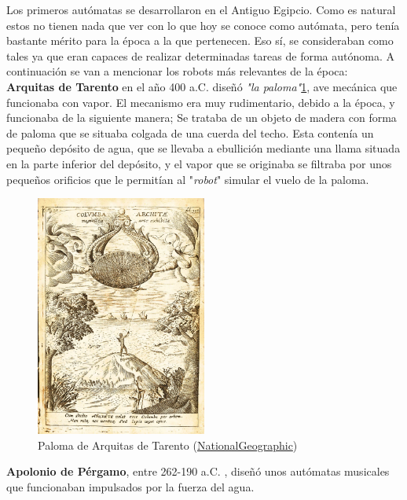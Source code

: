 Los primeros autómatas se desarrollaron en el Antiguo Egipcio. Como es natural estos no tienen nada que ver con lo que hoy se conoce como autómata, pero tenía bastante mérito para la época a la que pertenecen. Eso sí, se consideraban como tales ya que eran capaces de realizar determinadas tareas de forma autónoma. A continuación se van a mencionar los robots más relevantes de la época:\\

 \textbf{Arquitas de Tarento} en el año 400 a.C. diseñó \textit{"la paloma"}\ref{paloma}, ave mecánica que funcionaba con vapor. El mecanismo era muy rudimentario, debido a la época, y funcionaba de la siguiente manera; Se trataba de un objeto de madera con forma de paloma que se situaba colgada de una cuerda del techo. Esta contenía un pequeño depósito de agua, que se llevaba a ebullición mediante una llama situada en la parte inferior del depósito, y el vapor que se originaba se filtraba por unos pequeños orificios que le permitían al "\textit{robot}" simular el vuelo de la paloma.\\
 
\begin{figure}[H]
\begin{center}
  \includegraphics[width=0.5\textwidth]{./EtapaPrimeriza/imagenes/paloma.jpg}
  \caption{Paloma de Arquitas de Tarento (\href{https://www.nationalgeographic.com.es/historia/grandes-reportajes/inventos-griegos_9395/3}{NationalGeographic})}
  \label{paloma}
\end{center}
\end{figure}


\textbf{Apolonio de Pérgamo}, entre 262-190 a.C. , diseñó unos autómatas musicales que funcionaban impulsados por la fuerza del agua.\\


